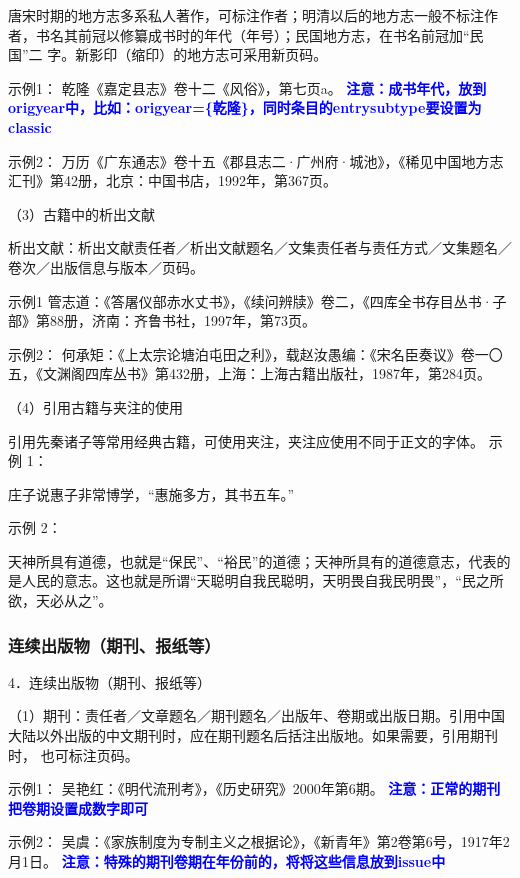 \documentclass{article}
\newcommand{\qd}[1]{\textbf{\textcolor{blue}{#1}}}
\begin{document}
唐宋时期的地方志多系私人著作，可标注作者；明清以后的地方志一般不标注作者，书名其前冠以修纂成书时的年代（年号）；民国地方志，在书名前冠加“民国”二
字。新影印（缩印）的地方志可采用新页码。

示例1：
乾隆《嘉定县志》卷十二《风俗》，第七页a。
 \qd{注意：成书年代，放到origyear中，比如：origyear=\{乾隆\}，同时条目的entrysubtype要设置为classic}

示例2：
万历《广东通志》卷十五《郡县志二·广州府·城池》，《稀见中国地方志汇刊》第42册，北京：中国书店，1992年，第367页。



（3）古籍中的析出文献

析出文献：析出文献责任者／析出文献题名／文集责任者与责任方式／文集题名／卷次／出版信息与版本／页码。

示例1
管志道：《答屠仪部赤水丈书》，《续问辨牍》卷二，《四库全书存目丛书·子部》第88册，济南：齐鲁书社，1997年，第73页。

示例2：
何承矩：《上太宗论塘泊屯田之利》，载赵汝愚编：《宋名臣奏议》卷一〇五，《文渊阁四库丛书》第432册，上海：上海古籍出版社，1987年，第284页。


（4）引用古籍与夹注的使用

引用先秦诸子等常用经典古籍，可使用夹注，夹注应使用不同于正文的字体。
 示例 1：

 庄子说惠子非常博学，“惠施多方，其书五车。”

 示例 2：

 天神所具有道德，也就是“保民”、“裕民”的道德；天神所具有的道德意志，代表的是人民的意志。这也就是所谓“天聪明自我民聪明，天明畏自我民明畏”，“民之所 欲，天必从之”。


\subsubsection{连续出版物（期刊、报纸等）}
4．连续出版物（期刊、报纸等）

（1）期刊：责任者／文章题名／期刊题名／出版年、卷期或出版日期。引用中国大陆以外出版的中文期刊时，应在期刊题名后括注出版地。如果需要，引用期刊时，
也可标注页码。

示例1：
吴艳红：《明代流刑考》，《历史研究》2000年第6期。
 \qd{注意：正常的期刊把卷期设置成数字即可}

示例2：
吴虞：《家族制度为专制主义之根据论》，《新青年》第2卷第6号，1917年2月1日。
 \qd{注意：特殊的期刊卷期在年份前的，将将这些信息放到issue中}
\end{document}
